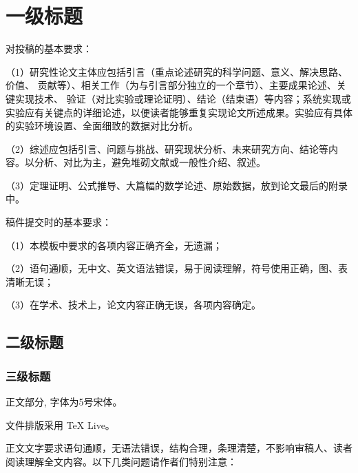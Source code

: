 \documentclass{cjc}
\begin{document}

\maketitle



\section{一级标题}

对投稿的基本要求：

（1）研究性论文主体应包括引言（重点论述研究的科学问题、意义、解决思路、价值、
贡献等）、相关工作（为与引言部分独立的一个章节）、主要成果论述、关键实现技术、
验证（对比实验或理论证明）、结论（结束语）等内容；系统实现或实验应有关键点的详细论述，以便读者能够重复实现论文所述成果。实验应有具体的实验环境设置、全面细致的数据对比分析。

（2）综述应包括引言、问题与挑战、研究现状分析、未来研究方向、结论等内容。以分析、对比为主，避免堆砌文献或一般性介绍、叙述。

（3）定理证明、公式推导、大篇幅的数学论述、原始数据，放到论文最后的附录中。

稿件提交时的基本要求：

（1）本模板中要求的各项内容正确齐全，无遗漏；

（2）语句通顺，无中文、英文语法错误，易于阅读理解，符号使用正确，图、表清晰无误；

（3）在学术、技术上，论文内容正确无误，各项内容确定。

\subsection{二级标题}

\subsubsection{三级标题}

正文部分, 字体为5号宋体。

文件排版采用 TeX Live。

正文文字要求语句通顺，无语法错误，结构合理，条理清楚，不影响审稿人、读者阅读理解全文内容。以下几类问题请作者们特别注意：
\end{document}
